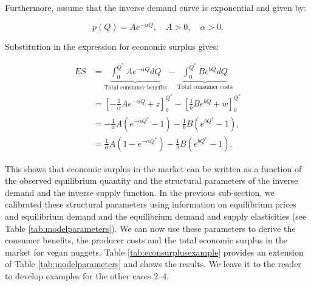 \documentclass[
]{book}
\begin{document}
Furthermore, assume that the inverse demand curve is exponential and given by:

\begin{equation}
p(Q) = Ae^{-\alpha Q}, \quad A>0, \quad \alpha >0.
\end{equation}

Substitution in the expression for economic surplus gives:

\begin{align}
ES &= \underbrace{\int_0^{Q^\ast} Ae^{-\alpha Q} dQ}_\text{Total consumer benefits} - \underbrace{\int^{Q^\ast}_0  B e^{bQ}dQ}_\text{Total consumer costs}\\
&= \left[-\frac{1}{\alpha}Ae^{-\alpha Q} + z\right]^{Q^\ast}_0 -  \left[\frac{1}{b}B e^{bQ} + w\right]^{Q^\ast}_0 \\
&= -\frac{1}{\alpha}A\left(e^{-\alpha Q^\ast} - 1 \right) -\frac{1}{b}B\left(e^{b Q^\ast} - 1 \right),\\
&= \frac{1}{\alpha}A\left(1 - e^{-\alpha Q^\ast} \right) -\frac{1}{b}B\left(e^{b Q^\ast} - 1 \right).
\end{align}

This shows that economic surplus in the market can be written as a function of the observed equilibrium quantity and the structural parameters of the inverse demand and the inverse supply function. In the previous sub-section, we calibrated these structural parameters using information on equilibrium prices and equilibrium demand and the equilibrium demand and supply elasticities (see Table \ref{tab:modelparameters}). We can now use these parameters to derive the consumer benefits, the producer costs and the total economic surplus in the market for vegan nuggets. Table \ref{tab:econsurplusexample} provides an extension of Table \ref{tab:modelparameters} and shows the results. We leave it to the reader to develop examples for the other cases 2--4.
\end{document}
